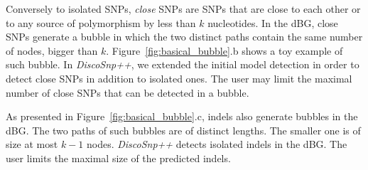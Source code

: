 \documentclass{bmcart}
\newcommand{\discopp}{{\it DiscoSnp++}\xspace}
\begin{document}
Conversely to isolated SNPs, \emph{close} SNPs are SNPs that are close to each other or to any source of polymorphism by less than $k$ nucleotides.
In the dBG, close SNPs generate a bubble in which the two distinct paths contain the same number of nodes, bigger than $k$.
Figure~\ref{fig:basical_bubble}.b shows a toy example of such bubble.  
In \discopp, we extended the initial model detection in order to detect close SNPs in addition to isolated ones. The user may limit the maximal number of close SNPs that can be detected in a bubble. %



As presented in Figure~\ref{fig:basical_bubble}.c, indels also generate bubbles in the dBG. The two paths of such bubbles are of distinct lengths. The smaller one is of size at most $k-1$ nodes. \discopp detects isolated indels in the dBG. The user limits the maximal size of the predicted indels. 
\end{document}
